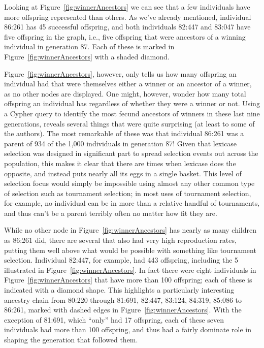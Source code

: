 Looking at Figure~\ref{fig:winnerAncestors} we can see that a few individuals have more offspring
represented than others. As we've already mentioned, individual 86:261 has 45 successful offspring,
and both individuals 82:447 and 83:047 have five offspring in the graph, i.e., five offspring that were
ancestors of a winning individual in generation 87. Each of these is marked in 
Figure~\ref{fig:winnerAncestors} with a shaded diamond.

Figure~\ref{fig:winnerAncestors},
however, only tells us how many offspring an individual had that were themselves either a winner
or an ancestor of a winner, as no other nodes are displayed. One
might, however, wonder how many total offspring an individual has
regardless of whether they were a winner or not. Using a Cypher query to identify the most
fecund ancestors of winners in these last nine generations, reveals several things that were
quite surprising (at least to some of the authors). The most remarkable of these was that individual 86:261 
was a parent of 934 of the 1,000 individuals in generation 87! Given that lexicase selection was
designed in significant part to spread selection events out across the population, this makes it
clear that there are times when lexicase does the opposite, and instead puts nearly all its eggs in
a single basket. This level of selection focus would simply be impossible using almost any other
common type of selection such as tournament selection; in most uses of tournament selection, 
for example, no individual can be in more than a relative handful of tournaments, and thus can't be
a parent terribly often no matter how fit they are.

While no other node in Figure~\ref{fig:winnerAncestors} has nearly as many children as 86:261 did,
there are several that also had very high reproduction rates, putting them well above what would be 
possible with something like tournament selection. Individual 82:447, for example, had
443 offspring, including the 5 illustrated in Figure~\ref{fig:winnerAncestors}. In fact there were
eight individuals in Figure~\ref{fig:winnerAncestors} that have more than 100 offspring; each of
these is indicated with a diamond shape. This highlights a particularly
interesting ancestry chain from 80:220 through 81:691, 82:447, 83:124, 84:319, 85:086 to 86:261, marked with
dashed edges in Figure~\ref{fig:winnerAncestors}. With the exception of 81:691, which ``only'' had 17
offspring, each of these seven individuals had more
than 100 offspring, and thus had a fairly dominate role in shaping the generation that followed them. 

